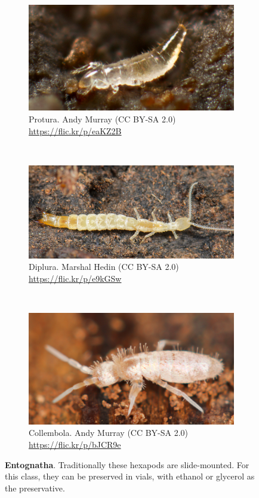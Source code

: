 \documentclass[letterpaper, 11pt]{article}
\begin{document}
\begin{figure}[h!]
    \centering
    \begin{subfigure}[b]{0.28\textwidth}
        \includegraphics[width=\textwidth]{Protura}
        \caption{Protura. Andy Murray (CC BY-SA 2.0) \url{https://flic.kr/p/eaKZ2B}}
        \label{fig:protura}
    \end{subfigure}
    ~ 
    \begin{subfigure}[b]{0.32\textwidth}
        \includegraphics[width=\textwidth]{Diplura}
        \caption{Diplura. Marshal Hedin (CC BY-SA 2.0) \url{https://flic.kr/p/e9kGSw}}
        \label{fig:diplura}
    \end{subfigure}
    ~ 
    \begin{subfigure}[b]{0.28\textwidth}
        \includegraphics[width=\textwidth]{Collembola}
        \caption{Collembola. Andy Murray (CC BY-SA 2.0) \url{https://flic.kr/p/bJCR9e}}
        \label{fig:collembola}
    \end{subfigure}
    \caption{\textbf{Entognatha}. Traditionally these hexapods are slide-mounted. For this class, they can be preserved in vials, with ethanol or glycerol as the preservative.}
    \label{fig:entognatha}
\end{figure}
\end{document}
